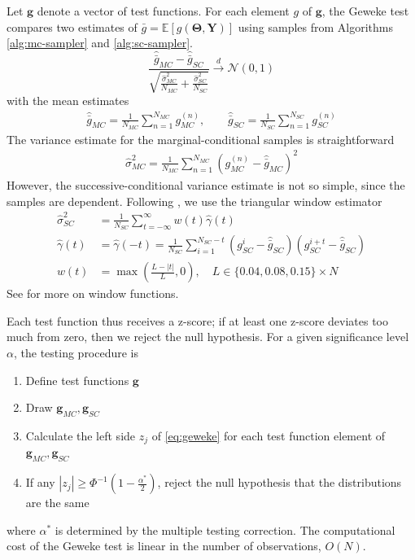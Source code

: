 \documentclass[a4paper,11pt]{article}
\newcommand{\E}{\mathbb{E}}
\begin{document}
Let $\mathbf{g}$ denote a vector of test functions. For each element $g$ of $\mathbf{g}$, the Geweke test compares two estimates of $\bar{g} = \E[g(\mathbf{\Theta}, \mathbf{Y})]$ using samples from Algorithms \ref{alg:mc-sampler} and \ref{alg:sc-sampler}.
\begin{equation}
    \frac{\hat{\bar{g}}_{MC} - \hat{\bar{g}}_{SC}}{\sqrt{ \frac{\hat{\sigma}^{2}_{MC}}{N_{MC}} + \frac{\hat{\sigma}^{2}_{SC}}{N_{SC}}}} \xrightarrow[]{d} \mathcal{N}(0, 1)
    \label{eq:geweke}
\end{equation}
with the mean estimates
\begin{align*}
    \hat{\bar{g}}_{MC} = \frac{1}{N_{MC}}\sum_{n=1}^{N_{MC}}g_{MC}^{(n)}, \qquad \hat{\bar{g}}_{SC} = \frac{1}{N_{SC}}\sum_{n=1}^{N_{SC}}g_{SC}^{(n)}
\end{align*}
The variance estimate for the marginal-conditional samples is straightforward
\begin{align*}
    \hat{\sigma}_{MC}^{2} = \frac{1}{N_{MC}}\sum_{n=1}^{N_{MC}}(g_{MC}^{(n)} - \hat{\bar{g}}_{MC})^{2}
\end{align*}
However, the successive-conditional variance estimate is not so simple, since the samples are dependent. Following \cite{geweke_using_1999}, we use the triangular window estimator
\begin{align*}
    \hat{\sigma}_{SC}^{2} &= \frac{1}{N_{SC}}\sum_{t=-\infty}^{\infty} w(t) \hat{\gamma}(t) \\
    \hat{\gamma}(t) &= \hat{\gamma}(-t) = \frac{1}{N_{SC}}\sum_{i=1}^{N_{SC}-t}(g_{SC}^{i} - \hat{\bar{g}}_{SC})(g_{SC}^{i+t} - \hat{\bar{g}}_{SC}) \\
    w(t) &= \max{\left(\frac{L-|t|}{L}, 0\right)}, \quad L \in \{0.04, 0.08, 0.15\} \times N
\end{align*}
See \cite{priestley_spectral_1981} for more on window functions.

Each test function thus receives a z-score; if at least one z-score deviates too much from zero, then we reject the null hypothesis. For a given significance level $\alpha$, the testing procedure is
\begin{enumerate}
    \item Define test functions $\mathbf{g}$
    \item Draw $\mathbf{g}_{MC}, \mathbf{g}_{SC}$
    \item Calculate the left side $z_{j}$ of \eqref{eq:geweke} for each test function element of $\mathbf{g}_{MC}, \mathbf{g}_{SC}$
    \item If any $|z_{j}| \geq \Phi^{-1}(1-\frac{\alpha^{*}}{2})$, reject the null hypothesis that the distributions are the same
\end{enumerate}
where $\alpha^{*}$ is determined by the multiple testing correction. The computational cost of the Geweke test is linear in the number of observations, $O(N)$.
\end{document}
